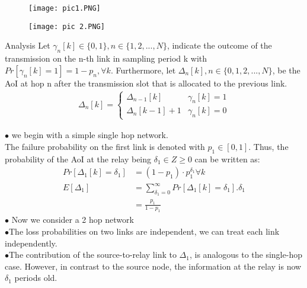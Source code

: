 \documentclass{beamer}
\begin{document}
\begin{frame}{}
    \begin{figure}[h]
    \centering
    \texttt{[image: pic1.PNG]}
\end{figure} 
\end{frame}


 \begin{frame}
   \begin{figure}[h]
    \centering
    \texttt{[image: pic 2.PNG]}
\end{figure}   
 \end{frame}


\begin{frame}{Analysis}
Let $\gamma_{n}[k] \in \{0, 1\}, n \in \{1, 2,..., N \}$, indicate the outcome
of the transmission on the n-th link in sampling period k with
$Pr[\gamma_{n}[k] = 1] = 1-p_n, \forall k$. Furthermore, let $ \Delta_n[k], n \in
\{0, 1, 2,..., N \}$, be the AoI at hop n after the transmission
slot that is allocated to the previous link.\\
\begin{align}
\Delta_n[k]=
\begin{cases}
 \Delta_{n-1}[k]&\gamma_n[k]=1\\
 \Delta_{n}[k-1]+1 &\gamma_n[k]=0
\end{cases}
\end{align}
\end{frame}

\begin{frame}{}
   $\bullet$ we begin with a simple single hop network.\\
   The failure probability on the first link is denoted with
$p_1 \in [0, 1]$. Thus, the probability of the AoI at the relay being
$\delta_1 \in Z\geq 0$ can be written as:\\
\begin{align}
    Pr[\Delta_1[k] = \delta_1] &= (1-p_1) · p_1^{\delta_1} \forall k\\
    E[\Delta_1]&=\sum_{\delta_1=0}^\infty Pr[\Delta_1[k]=\delta_1].\delta_1\\
    &=\frac{p_1}{1-p_1}
    \end{align}
    $\bullet$ Now we consider a 2 hop network\\
    $\bullet$The loss probabilities on two links are independent, we can treat each link independently.\\
    $\bullet$The contribution of the source-to-relay link to $\Delta_1$, is analogous to the single-hop case. However, in contrast to the source
node, the information at the relay is now $\delta_1$ periods old.\\
\end{frame}
\end{document}
